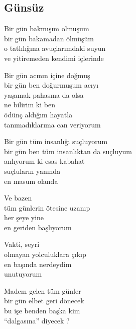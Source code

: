 \subsection{Günsüz}

Bir gün bakmışım olmuşum \\
bir gün bakamadan ölmüşüm \\
o tatlılığına avuçlarımdaki suyun \\
ve yitiremeden kendimi içlerinde

\noindent\newline
Bir gün acının içine doğmuş \\
bir gün ben doğurmuşum acıyı \\
yaşamak pahasına da olsa \\
ne bilirim ki ben \\
ödünç aldığım hayatla \\
tanımadıklarıma can veriyorum

\noindent\newline
Bir gün tüm insanlığı suçluyorum \\
bir gün ben tüm insanlıktan da suçluyum \\
anlıyorum ki esas kabahat \\
suçluların yanında \\
en masum olanda

\noindent\newline
Ve bazen \\
tüm günlerin ötesine uzanıp \\
her şeye yine \\
en geriden başlıyorum

\noindent\newline
Vakti, seyri \\
olmayan yolculuklara çıkıp \\
en başında nerdeydim \\
unutuyorum

\noindent\newline
Madem gelen tüm günler \\
bir gün elbet geri dönecek \\
bu işe benden başka kim \\
“dalgasına” diyecek ?